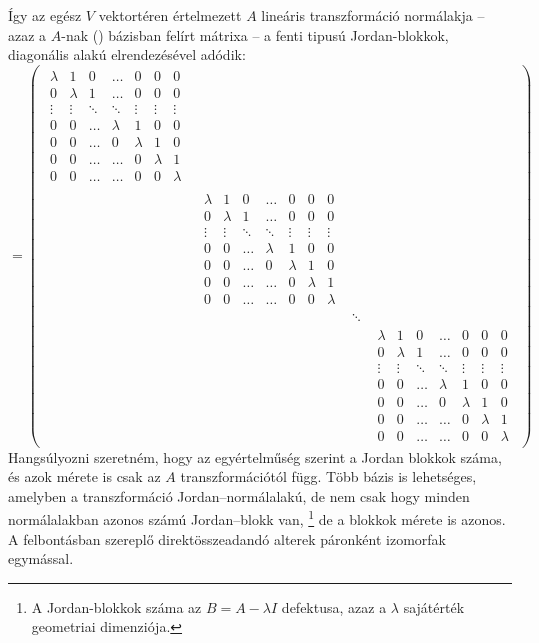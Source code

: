 \documentclass[9pt, a4paper, showtrims]{memoir}
\theoremstyle{plain}
\theoremstyle{remark}
\theoremstyle{definition}
\begin{document}
Így az egész $V$ vektortéren értelmezett $A$ lineáris transzformáció normálakja 
--
azaz a $A$-nak (\dag) bázisban felírt mátrixa 
-- 
a fenti tipusú Jordan-blokkok, diagonális alakú elrendezésével adódik:
\begin{displaymath}
    [A]=
    \begin{pmatrix}
        \begin{matrix}
            \lambda&1&0&\dots& 0 &0&0\\
            0&\lambda&1&\dots& 0 &0&0\\
            \vdots&\vdots&\ddots&\ddots&\vdots&\vdots&\vdots\\
            0&0&\dots&\lambda& 1 &0&0\\
            0&0&\dots&0& \lambda&1&0\\
            0&0&\dots&\dots& 0 &\lambda&1\\
            0&0&\dots&\dots& 0 &0&\lambda
        \end{matrix}&&&\\
        &\!\!\!
        \begin{matrix}
            \lambda&1&0&\dots& 0 &0&0\\
            0&\lambda&1&\dots& 0 &0&0\\
            \vdots&\vdots&\ddots&\ddots&\vdots&\vdots&\vdots\\
            0&0&\dots&\lambda& 1 &0&0\\
            0&0&\dots&0& \lambda&1&0\\
            0&0&\dots&\dots& 0 &\lambda&1\\
            0&0&\dots&\dots& 0 &0&\lambda
        \end{matrix}
        &&\\
        &&\ddots&\\
        &&&
        \begin{matrix}
            \lambda&1&0&\dots& 0 &0&0\\
            0&\lambda&1&\dots& 0 &0&0\\
            \vdots&\vdots&\ddots&\ddots&\vdots&\vdots&\vdots\\
            0&0&\dots&\lambda& 1 &0&0\\
            0&0&\dots&0& \lambda&1&0\\
            0&0&\dots&\dots& 0 &\lambda&1\\
            0&0&\dots&\dots& 0 &0&\lambda
        \end{matrix}
    \end{pmatrix}
\end{displaymath}
Hangsúlyozni szeretném, hogy az egyértelműség szerint a Jordan blokkok száma, és azok mérete is csak
az $A$ transzformációtól függ.
Több bázis is lehetséges, amelyben a transzformáció Jordan--normálalakú, 
de nem csak hogy minden normálalakban azonos számú Jordan--blokk van,
\footnote{A Jordan-blokkok száma az $B=A-\lambda I$ defektusa, azaz a $\lambda$ sajátérték
    geometriai dimenziója.}
de a blokkok mérete is azonos.
A felbontásban szereplő direktösszeadandó alterek páronként izomorfak egymással.
\end{document}
